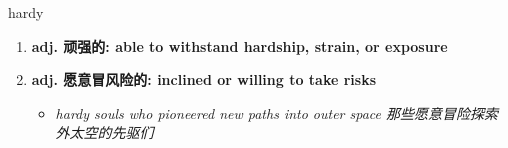 
\begin{frame}
{\huge hardy}
\begin{center}
\begin{enumerate}\Large
  \item \textbf{adj. 顽强的: able to withstand hardship, strain, or exposure}
  \item \textbf{adj. 愿意冒风险的: inclined or willing to take risks}
  \begin{itemize}
    \item \em{\Large{hardy souls who pioneered new paths into outer space 那些愿意冒险探索外太空的先驱们}}
  \end{itemize}
\end{enumerate}
\end{center}
\end{frame}
